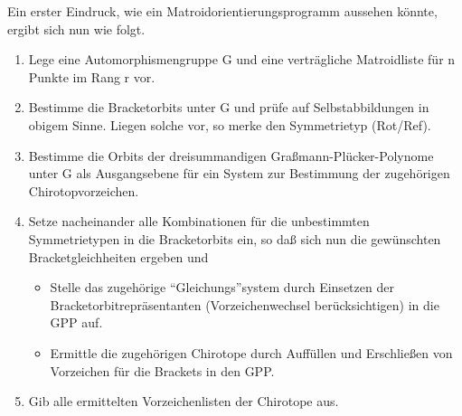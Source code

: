 Ein erster Eindruck, wie ein Matroidorientierungsprogramm aussehen könnte,
ergibt sich nun wie folgt.
\begin{enumerate}
\item Lege eine Automorphismengruppe G und eine verträgliche Matroidliste
      für n Punkte im Rang r vor.
\item Bestimme die Bracketorbits unter G und prüfe auf Selbstabbildungen in
      obigem Sinne. Liegen solche vor, so merke den Symmetrietyp (Rot/Ref).
\item Bestimme die Orbits der dreisummandigen Graßmann-Plücker-Polynome
      unter G als Ausgangsebene für ein System zur Bestimmung der zugehörigen
      Chirotopvorzeichen.
\item Setze nacheinander alle Kombinationen für die unbestimmten Symmetrietypen
      in die Bracketorbits ein, so daß sich nun die gewünschten
      Bracketgleichheiten ergeben und
\begin{itemize}
\item Stelle das zugehörige "`Gleichungs"'system durch Einsetzen der
      Bracket\-orbitrepräsentanten (Vorzeichenwechsel berücksichtigen)
      in die GPP auf.
\item Ermittle die zugehörigen Chirotope durch Auffüllen und Erschließen von
      Vorzeichen für die Brackets in den GPP.
\end{itemize}
\item Gib alle ermittelten Vorzeichenlisten der Chirotope aus.
\end{enumerate}

